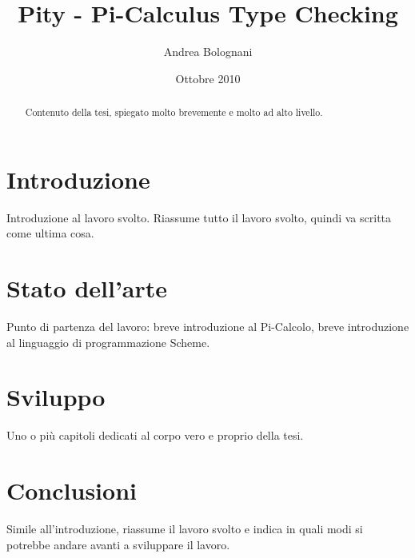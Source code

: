 \documentclass[a4paper,draft]{article}
\begin{document}
\title{Pity - Pi-Calculus Type Checking}
\author{Andrea Bolognani}
\date{Ottobre 2010}

\maketitle


\begin{abstract}
Contenuto della tesi, spiegato molto brevemente e molto ad alto livello.
\end{abstract}


\clearpage

\tableofcontents

\clearpage


\section{Introduzione}

Introduzione al lavoro svolto. Riassume tutto il lavoro svolto, quindi
va scritta come ultima cosa.


\section{Stato dell'arte}

Punto di partenza del lavoro: breve introduzione al Pi-Calcolo, breve
introduzione al linguaggio di programmazione Scheme.


\section{Sviluppo}

Uno o pi\`u capitoli dedicati al corpo vero e proprio della tesi.


\section{Conclusioni}

Simile all'introduzione, riassume il lavoro svolto e indica in quali
modi si potrebbe andare avanti a sviluppare il lavoro.
\end{document}
